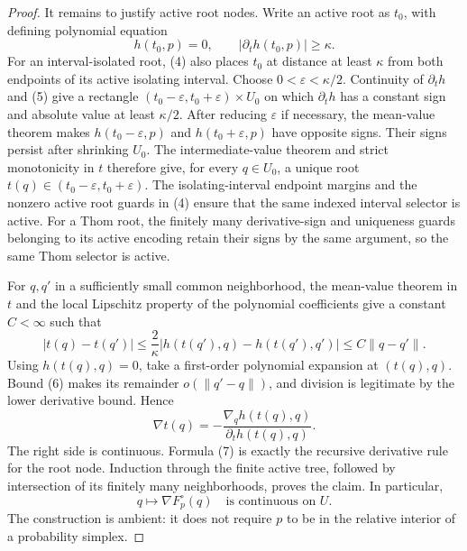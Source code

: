 \documentclass{article}
\begin{document}
\begin{proof}
It remains to justify active root nodes.  Write an active root as \(t_0\), with defining polynomial equation
\[
 h(t_0,p)=0,
 \qquad
 |\partial_t h(t_0,p)|\geq\kappa. \tag{5}
\]
For an interval-isolated root, (4) also places \(t_0\) at distance at least \(\kappa\) from both endpoints of its active isolating interval.  Choose \(0<\varepsilon<\kappa/2\).  Continuity of \(\partial_t h\) and (5) give a rectangle \((t_0-\varepsilon,t_0+\varepsilon)\times U_0\) on which \(\partial_t h\) has a constant sign and absolute value at least \(\kappa/2\).  After reducing \(\varepsilon\) if necessary, the mean-value theorem makes \(h(t_0-\varepsilon,p)\) and \(h(t_0+\varepsilon,p)\) have opposite signs.  Their signs persist after shrinking \(U_0\).  The intermediate-value theorem and strict monotonicity in \(t\) therefore give, for every \(q\in U_0\), a unique root \(t(q)\in(t_0-\varepsilon,t_0+\varepsilon)\).  The isolating-interval endpoint margins and the nonzero active root guards in (4) ensure that the same indexed interval selector is active.  For a Thom root, the finitely many derivative-sign and uniqueness guards belonging to its active encoding retain their signs by the same argument, so the same Thom selector is active.

For \(q,q'\) in a sufficiently small common neighborhood, the mean-value theorem in \(t\) and the local Lipschitz property of the polynomial coefficients give a constant \(C<\infty\) such that
\[
 |t(q)-t(q')|
 \leq \frac{2}{\kappa}
       |h(t(q'),q)-h(t(q'),q')|
 \leq C\lVert q-q'\rVert. \tag{6}
\]
Using \(h(t(q),q)=0\), take a first-order polynomial expansion at \((t(q),q)\).  Bound (6) makes its remainder \(o(\lVert q'-q\rVert)\), and division is legitimate by the lower derivative bound.  Hence
\[
 \nabla t(q)
 =-\frac{\nabla_q h(t(q),q)}{\partial_t h(t(q),q)}. \tag{7}
\]
The right side is continuous.  Formula (7) is exactly the recursive derivative rule for the root node.  Induction through the finite active tree, followed by intersection of its finitely many neighborhoods, proves the claim.  In particular,
\[
 q\longmapsto\nabla F_p^{\circ}(q)
 \quad\text{is continuous on }U. \tag{8}
\]
The construction is ambient: it does not require \(p\) to be in the relative interior of a probability simplex.


\end{proof}
\end{document}

